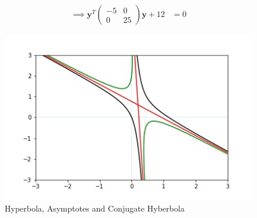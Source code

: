 \documentclass[journal,12pt,twocolumn]{IEEEtran}
\let\vec\mathbf
\numberwithin{equation}{subsection}
\newcommand{\myvec}[1]{\ensuremath{\begin{pmatrix}#1\end{pmatrix}}}
\begin{document}
\begin{align}
     \implies\vec{y}^T\myvec{-5 & 0 \\0 & 25}\vec{y} + 12&= 0
\end{align}
\begin{figure}[!]
\includegraphics[width=1\columnwidth]{hyperbola.jpg}
\caption{Hyperbola, Asymptotes and Conjugate Hyberbola}
\end{figure}
\end{document}
